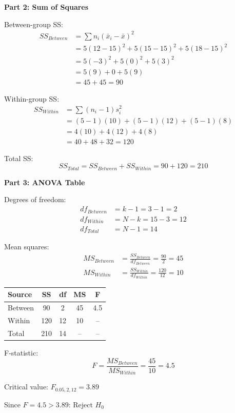 \documentclass[10pt,twocolumn]{article}
\begin{document}
\textbf{Part 2: Sum of Squares}

Between-group SS:
\begin{align*}
SS_{Between} &= \sum n_i(\bar{x}_i - \bar{x})^2 \\
&= 5(12-15)^2 + 5(15-15)^2 + 5(18-15)^2 \\
&= 5(-3)^2 + 5(0)^2 + 5(3)^2 \\
&= 5(9) + 0 + 5(9) \\
&= 45 + 45 = \boxed{90}
\end{align*}

Within-group SS:
\begin{align*}
SS_{Within} &= \sum (n_i-1)s_i^2 \\
&= (5-1)(10) + (5-1)(12) + (5-1)(8) \\
&= 4(10) + 4(12) + 4(8) \\
&= 40 + 48 + 32 = \boxed{120}
\end{align*}

Total SS:
$$SS_{Total} = SS_{Between} + SS_{Within} = 90 + 120 = \boxed{210}$$

\textbf{Part 3: ANOVA Table}

Degrees of freedom:
\begin{align*}
df_{Between} &= k - 1 = 3 - 1 = 2 \\
df_{Within} &= N - k = 15 - 3 = 12 \\
df_{Total} &= N - 1 = 14
\end{align*}

Mean squares:
\begin{align*}
MS_{Between} &= \frac{SS_{Between}}{df_{Between}} = \frac{90}{2} = 45 \\
MS_{Within} &= \frac{SS_{Within}}{df_{Within}} = \frac{120}{12} = 10
\end{align*}

\begin{tabular}{lcccc}
\toprule
Source & SS & df & MS & F \\
\midrule
Between & 90 & 2 & 45 & 4.5 \\
Within & 120 & 12 & 10 & -- \\
Total & 210 & 14 & -- & -- \\
\bottomrule
\end{tabular}

F-statistic:
$$F = \frac{MS_{Between}}{MS_{Within}} = \frac{45}{10} = \boxed{4.5}$$

Critical value: $F_{0.05,2,12} = 3.89$

Since $F = 4.5 > 3.89$: $\boxed{\text{Reject } H_0}$
\end{document}
